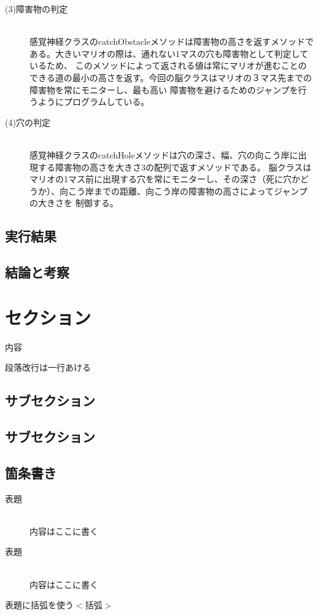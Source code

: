 \documentclass[a4j]{jarticle}
\begin{document}
\begin{description}
  \item[(3)障害物の判定]~\\
  	感覚神経クラスのcatchObstacleメソッドは障害物の高さを返すメソッドである。大きいマリオの際は、通れない1マスの穴も障害物として判定しているため、
  	このメソッドによって返される値は常にマリオが進むことのできる道の最小の高さを返す。今回の脳クラスはマリオの３マス先までの障害物を常にモニターし、最も高い
  	障害物を避けるためのジャンプを行うようにプログラムしている。
  	
  \item[(4)穴の判定]~\\
  	感覚神経クラスのcatchHoleメソッドは穴の深さ、幅、穴の向こう岸に出現する障害物の高さを大きさ3の配列で返すメソッドである。
  	脳クラスはマリオの1マス前に出現する穴を常にモニターし、その深さ（死に穴かどうか）、向こう岸までの距離、向こう岸の障害物の高さによってジャンプの大きさを
  	制御する。
 \end{description}
\subsection{実行結果}
\subsection{結論と考察}


\section{セクション}
内容

段落改行は一行あける
\subsection{サブセクション}
\subsection{サブセクション}

\subsection{箇条書き}
\begin{description}
\item [表題]~\\
内容はここに書く
\item[表題]\mbox{}\\
内容はここに書く
\item[表題に括弧を使う$<$括弧$>$]
\end{description}
\end{document}
